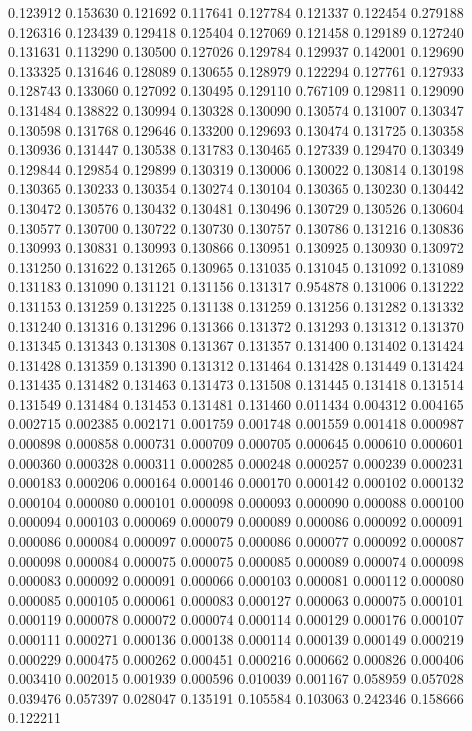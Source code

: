 0.123912
0.153630
0.121692
0.117641
0.127784
0.121337
0.122454
0.279188
0.126316
0.123439
0.129418
0.125404
0.127069
0.121458
0.129189
0.127240
0.131631
0.113290
0.130500
0.127026
0.129784
0.129937
0.142001
0.129690
0.133325
0.131646
0.128089
0.130655
0.128979
0.122294
0.127761
0.127933
0.128743
0.133060
0.127092
0.130495
0.129110
0.767109
0.129811
0.129090
0.131484
0.138822
0.130994
0.130328
0.130090
0.130574
0.131007
0.130347
0.130598
0.131768
0.129646
0.133200
0.129693
0.130474
0.131725
0.130358
0.130936
0.131447
0.130538
0.131783
0.130465
0.127339
0.129470
0.130349
0.129844
0.129854
0.129899
0.130319
0.130006
0.130022
0.130814
0.130198
0.130365
0.130233
0.130354
0.130274
0.130104
0.130365
0.130230
0.130442
0.130472
0.130576
0.130432
0.130481
0.130496
0.130729
0.130526
0.130604
0.130577
0.130700
0.130722
0.130730
0.130757
0.130786
0.131216
0.130836
0.130993
0.130831
0.130993
0.130866
0.130951
0.130925
0.130930
0.130972
0.131250
0.131622
0.131265
0.130965
0.131035
0.131045
0.131092
0.131089
0.131183
0.131090
0.131121
0.131156
0.131317
0.954878
0.131006
0.131222
0.131153
0.131259
0.131225
0.131138
0.131259
0.131256
0.131282
0.131332
0.131240
0.131316
0.131296
0.131366
0.131372
0.131293
0.131312
0.131370
0.131345
0.131343
0.131308
0.131367
0.131357
0.131400
0.131402
0.131424
0.131428
0.131359
0.131390
0.131312
0.131464
0.131428
0.131449
0.131424
0.131435
0.131482
0.131463
0.131473
0.131508
0.131445
0.131418
0.131514
0.131549
0.131484
0.131453
0.131481
0.131460
0.011434
0.004312
0.004165
0.002715
0.002385
0.002171
0.001759
0.001748
0.001559
0.001418
0.000987
0.000898
0.000858
0.000731
0.000709
0.000705
0.000645
0.000610
0.000601
0.000360
0.000328
0.000311
0.000285
0.000248
0.000257
0.000239
0.000231
0.000183
0.000206
0.000164
0.000146
0.000170
0.000142
0.000102
0.000132
0.000104
0.000080
0.000101
0.000098
0.000093
0.000090
0.000088
0.000100
0.000094
0.000103
0.000069
0.000079
0.000089
0.000086
0.000092
0.000091
0.000086
0.000084
0.000097
0.000075
0.000086
0.000077
0.000092
0.000087
0.000098
0.000084
0.000075
0.000075
0.000085
0.000089
0.000074
0.000098
0.000083
0.000092
0.000091
0.000066
0.000103
0.000081
0.000112
0.000080
0.000085
0.000105
0.000061
0.000083
0.000127
0.000063
0.000075
0.000101
0.000119
0.000078
0.000072
0.000074
0.000114
0.000129
0.000176
0.000107
0.000111
0.000271
0.000136
0.000138
0.000114
0.000139
0.000149
0.000219
0.000229
0.000475
0.000262
0.000451
0.000216
0.000662
0.000826
0.000406
0.003410
0.002015
0.001939
0.000596
0.010039
0.001167
0.058959
0.057028
0.039476
0.057397
0.028047
0.135191
0.105584
0.103063
0.242346
0.158666
0.122211
